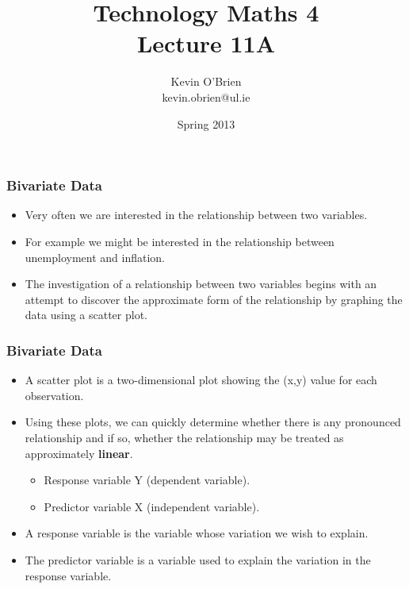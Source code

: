 \documentclass[a4]{beamer}
\title[MA4704]{Technology Maths 4 \\ {\normalsize Lecture 11A}}
\author[Kevin O'Brien]{Kevin O'Brien \\ {\scriptsize kevin.obrien@ul.ie}}
\date{Spring 2013}
\institute[Maths \& Stats]{Dept. of Mathematics \& Statistics, \\ University \textit{of} Limerick}
\begin{document}
\begin{frame}
\titlepage
\end{frame}



\begin{frame}
\frametitle{Bivariate Data}
\begin{itemize}
\item Very often we are interested in the relationship between two
variables.
\item For example we might be interested in the relationship between
unemployment and inflation.
\item The investigation of a relationship between two variables
begins with an attempt to discover the approximate form of the
relationship by graphing the data using a scatter plot.
\end{itemize}	
\end{frame}
\begin{frame}
\frametitle{Bivariate Data}
\begin{itemize}
\item  A scatter plot is a two-dimensional plot showing the (x,y) value for each
observation.

\item  Using these plots, we can quickly determine whether there is
any pronounced relationship and if so, whether the relationship may be
treated as approximately \textbf{linear}.\\
\begin{itemize}
\item Response variable Y (dependent variable).\\
\item Predictor variable X (independent variable).
\end{itemize}
\item A response variable is the variable whose variation we wish to explain.
\item The predictor variable is a variable used to explain the variation in the
response variable.
\end{itemize}	
\end{frame}
\end{document}

